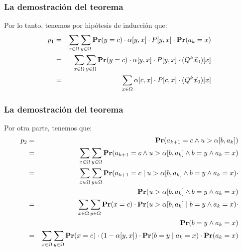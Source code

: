 \documentclass{beamer}
\newcommand{\pr}{{\rm {\bf Pr}}}
\begin{document}
	
	
	
	
	\begin{frame}
		\frametitle{La demostración del teorema}
		
		{\footnotesize
			
			Por lo tanto, tenemos por hipótesis de inducción que:
			\begin{eqnarray*}
				p_1 
				&=& \sum_{x\in\Omega}\sum_{y\in\Omega} \pr(y=c) \cdot 
				\alpha[y,x] \cdot P[y,x] \cdot \pr(a_k=x) \\
				&=& \sum_{x\in\Omega}\sum_{y\in\Omega} \pr(y=c) \cdot
				\alpha[y,x] \cdot P[y,x] \cdot (Q^k \vec x_0)[x] \\
				&=& \sum_{x\in\Omega} 
				\alpha[c,x] \cdot P[c,x] \cdot (Q^k \vec x_0)[x]
			\end{eqnarray*}
			
		}
		
	\end{frame}
	
	
	
	
	
	\begin{frame}
		\frametitle{La demostración del teorema}
		
		{\footnotesize
			
			
			Por otra parte, tenemos que:
			\begin{eqnarray*}
				p_2 
				&=& \pr(a_{k+1}=c \wedge u > \alpha[b,a_k]) \\
				&=& \sum_{x\in\Omega}\sum_{y\in\Omega}
				\pr(a_{k+1}=c \wedge u > \alpha[b,a_k] \wedge b=y \wedge a_k=x) \\
				&=& \sum_{x\in\Omega}\sum_{y\in\Omega}
				\pr(a_{k+1}=c \mid u > \alpha[b,a_k] \wedge b=y \wedge a_k=x) \cdot\\
				&&  \hspace{121.5pt} \pr(u > \alpha[b,a_k] \wedge b=y \wedge a_k=x) \\
				&=& \sum_{x\in\Omega}\sum_{y\in\Omega} \pr(x=c) \cdot
				\pr(u > \alpha[b,a_k] \mid b=y \wedge a_k=x) \cdot\\
				&&  \hspace{178.5pt} \pr(b=y \wedge a_k=x) \\
				&=& \sum_{x\in\Omega}\sum_{y\in\Omega} \pr(x=c) \cdot
				(1 - \alpha[y,x]) \cdot \pr(b=y \mid a_k=x) \cdot \pr(a_k=x) 
			\end{eqnarray*}
			
		}
		
	\end{frame}
	
\end{document}
